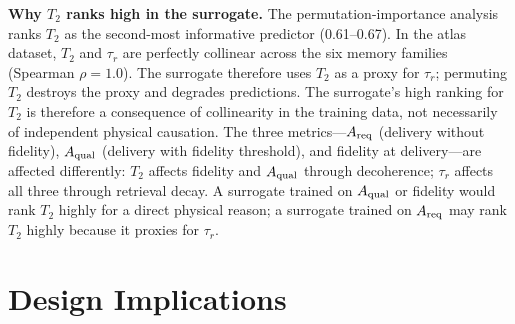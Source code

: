 \documentclass[quantumrep,article,submit,moreauthors]{Definitions/mdpi}
\begin{document}
\textbf{Why $T_2$ ranks high in the surrogate.} The permutation-importance analysis ranks $T_2$ as the second-most informative predictor (0.61--0.67). In the atlas dataset, $T_2$ and $\tau_r$ are perfectly collinear across the six memory families (Spearman $\rho = 1.0$). The surrogate therefore uses $T_2$ as a proxy for $\tau_r$; permuting $T_2$ destroys the proxy and degrades predictions. The surrogate's high ranking for $T_2$ is therefore a consequence of collinearity in the training data, not necessarily of independent physical causation. The three metrics---$A_{\rm req}$ (delivery without fidelity), $A_{\rm qual}$ (delivery with fidelity threshold), and fidelity at delivery---are affected differently: $T_2$ affects fidelity and $A_{\rm qual}$ through decoherence; $\tau_r$ affects all three through retrieval decay. A surrogate trained on $A_{\rm qual}$ or fidelity would rank $T_2$ highly for a direct physical reason; a surrogate trained on $A_{\rm req}$ may rank $T_2$ highly because it proxies for $\tau_r$.

\FloatBarrier

\section{Design Implications}
\end{document}
